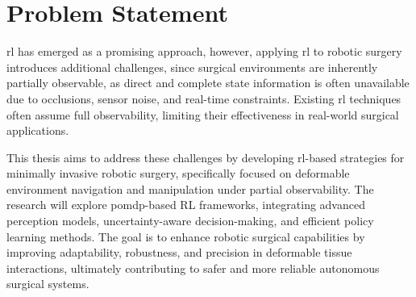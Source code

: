 \section{Problem Statement}
\gls{rl} has emerged as a promising approach, 
however, applying \gls{rl} to robotic surgery introduces additional challenges, since surgical environments 
are inherently partially observable, as direct and complete state information is 
often unavailable due to occlusions, sensor noise, and real-time constraints. 
Existing \gls{rl} techniques often assume full observability, limiting their 
effectiveness in real-world surgical applications.

This thesis aims to address these challenges by developing \gls{rl}-based 
strategies for minimally invasive robotic surgery, specifically focused on deformable environment navigation 
and manipulation under partial observability. The research will explore 
\gls{pomdp}-based RL frameworks, integrating advanced perception models, uncertainty-aware 
decision-making, and efficient policy learning methods. The goal is to enhance 
robotic surgical capabilities by improving adaptability, robustness, and precision 
in deformable tissue interactions, ultimately contributing to safer and more reliable 
autonomous surgical systems.




